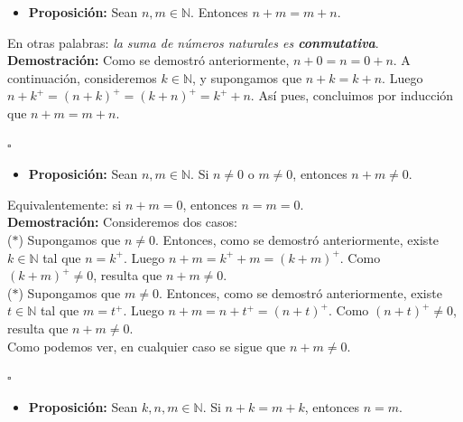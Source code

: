 \documentclass[10 pt]{article}
\begin{document}
\begin{itemize}
    \item \Large{\textbf{Proposición:} Sean $n,m \in \mathbb N$. Entonces $n+m=m+n$.} \\
\end{itemize}

\Large{En otras palabras: \textit{la suma de números naturales es \textbf{conmutativa}}.} \\

\Large{\textbf{Demostración:} Como se demostró anteriormente, $n+0=n=0+n$. A continuación, consideremos $k \in \mathbb N$, y supongamos que $n+k=k+n$. Luego $n+k^+=(n+k)^+=(k+n)^+=k^++n$. Así pues, concluimos por inducción que $n+m=m+n$.} \\

\begin{flushright}
    $\square$
\end{flushright}

\begin{itemize}
    \item \Large{\textbf{Proposición:} Sean $n,m \in \mathbb N$. Si $n \neq 0$ o $m \neq 0$, entonces $n+m \neq 0$.} \\
\end{itemize}

\Large{Equivalentemente: si $n+m=0$, entonces $n=m=0$.} \\

\Large{\textbf{Demostración:} Consideremos dos casos: \\

($\ast$) Supongamos que $n \neq 0$. Entonces, como se demostró anteriormente, existe $k \in \mathbb N$ tal que $n=k^+$. Luego $n+m=k^++m=(k+m)^+$. Como $(k+m)^+ \neq 0$, resulta que $n+m \neq 0$. \\

($\ast$) Supongamos que $m \neq 0$. Entonces, como se demostró anteriormente, existe $t \in \mathbb N$ tal que $m=t^+$. Luego $n+m=n+t^+=(n+t)^+$. Como $(n+t)^+ \neq 0$, resulta que $n+m \neq 0$. \\

Como podemos ver, en cualquier caso se sigue que $n+m \neq 0$.} \\

\begin{flushright}
    $\square$
\end{flushright}

\begin{itemize}
    \item \Large{\textbf{Proposición:} Sean $k,n,m \in \mathbb N$. Si $n+k=m+k$, entonces $n=m$.} \\
\end{itemize}
\end{document}
